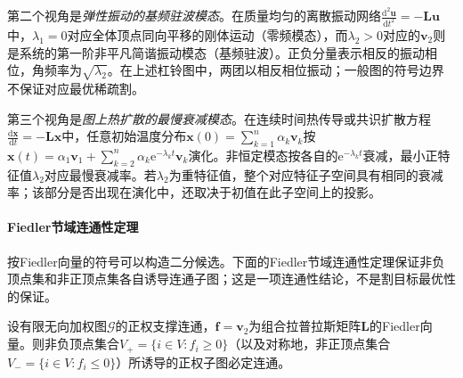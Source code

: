 第二个视角是\emph{弹性振动的基频驻波模态}。在质量均匀的离散振动网络$\frac{\mathrm d^2\bm u}{\mathrm dt^2}=-\bm L\bm u$中，$\lambda_1=0$对应全体顶点同向平移的刚体运动（零频模态），而$\lambda_2>0$对应的$\bm v_2$则是系统的第一阶非平凡简谐振动模态（基频驻波）。正负分量表示相反的振动相位，角频率为$\sqrt{\lambda_2}$。在上述杠铃图中，两团以相反相位振动；一般图的符号边界不保证对应最优稀疏割。

第三个视角是\emph{图上热扩散的最慢衰减模态}。在连续时间热传导或共识扩散方程$\frac{\mathrm d\bm x}{\mathrm dt}=-\bm L\bm x$中，任意初始温度分布$\bm x(0)=\sum_{k=1}^n\alpha_k\bm v_k$按$\bm x(t)=\alpha_1\bm v_1+\sum_{k=2}^n\alpha_k\mathrm e^{-\lambda_k t}\bm v_k$演化。非恒定模态按各自的$\mathrm e^{-\lambda_k t}$衰减，最小正特征值$\lambda_2$对应最慢衰减率。若$\lambda_2$为重特征值，整个对应特征子空间具有相同的衰减率；该部分是否出现在演化中，还取决于初值在此子空间上的投影。

\paragraph{Fiedler节域连通性定理}

按Fiedler向量的符号可以构造二分候选。下面的Fiedler节域连通性定理保证非负顶点集和非正顶点集各自诱导连通子图；这是一项连通性结论，不是割目标最优性的保证。

\begin{theorem}[Fiedler节域连通性定理]
\label{thm:graph-fiedler-connected-side}
设有限无向加权图$\mathcal G$的正权支撑连通，$\bm f=\bm v_2$为组合拉普拉斯矩阵$\bm L$的Fiedler向量。则非负顶点集合$V_+=\{i\in V:f_i\geq 0\}$（以及对称地，非正顶点集合$V_-=\{i\in V:f_i\leq 0\}$）所诱导的正权子图必定连通。
\end{theorem}

